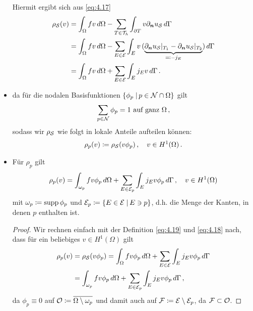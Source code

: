\begin{itemize}
Hiermit ergibt sich aus \eqref{eq:4.17}
\begin{align}\notag
	\rho_{\mathcal S} (v) &= \int_{\Omega} fv \, d\Omega - \sum_{T\in \mathcal T_h} \int_{\partial T} v \partial_{\boldsymbol n} u_{\mathcal S} \, d\Gamma \\
	\notag
	& = \int_{\Omega} fv \, d\Omega - \sum_{E\in \mathcal E} \int_{E} v\, (\underbrace{\partial_{\boldsymbol n} u_{\mathcal S}|_{T_1}-\partial_{\boldsymbol n} u_{\mathcal S}|_{T_2}}_{\eqqcolon -j_E}) \, d\Gamma \\
	\label{eq:4.18}
	& =  \int_{\Omega} fv \, d\Omega + \sum_{E\in \mathcal E} \int_{E} j_E v \, d\Gamma \, .
\end{align}

\item da für die nodalen Basisfunktionen $\{\phi_p \;\vert\, p \in \mathcal N\cap \Omega\}$ gilt
\[
	\sum_{p \in \mathcal N} \phi_p = 1 \text{ auf ganz } \Omega \, , 
\]
sodass wir $\rho_{\mathcal S}$ wie folgt in lokale Anteile aufteilen können:
\begin{align}\label{eq:4.19}
	\rho_p(v) \coloneqq \rho_{\mathcal S} (v \phi_p) \, , \quad v \in H^1(\Omega) \, .
\end{align}

\item
\begin{lemma}\label{lem:4.14}
Für $\rho_p$ gilt
\begin{align*}
	\rho_p (v) = \int_{\omega_p} f v \phi_p \, d\Omega + \sum_{E\in \mathcal E_p} \int_E j_E v \phi_p \, d\Gamma  \, , \quad v \in H^1(\Omega)
\end{align*}
mit $\omega_p \coloneqq \operatorname{supp} \phi_p$ und $\mathcal E_p \coloneqq \{E \in \mathcal E \;\vert\, E \ni p\}$, d.h. die Menge der Kanten, in denen $p$ enthalten ist.
\end{lemma}

\begin{proof}
Wir rechnen einfach mit der Definition \eqref{eq:4.19} und \eqref{eq:4.18} nach, dass für ein beliebiges $v \in H^1(\Omega)$ gilt
\begin{align*}
	\rho_p(v) &= \rho_{\mathcal S} (v \phi_p) =  \int_{\Omega} fv\phi_p \, d\Omega + \sum_{E\in \mathcal E} \int_{E} j_E v \phi_p\, d\Gamma \\
	& = \int_{\omega_p} f v \phi_p \, d\Omega + \sum_{E\in \mathcal E_p} \int_E j_E v \phi_p \, d\Gamma  \, ,
\end{align*}
da $\phi_p \equiv 0$ auf $\mathcal O \coloneqq \overline{\Omega \setminus \omega_p}$ und damit auch auf $\mathcal F \coloneqq\mathcal E \setminus \mathcal E_p$, da $\mathcal F \subset\mathcal O$.


\end{proof}
\end{itemize}
